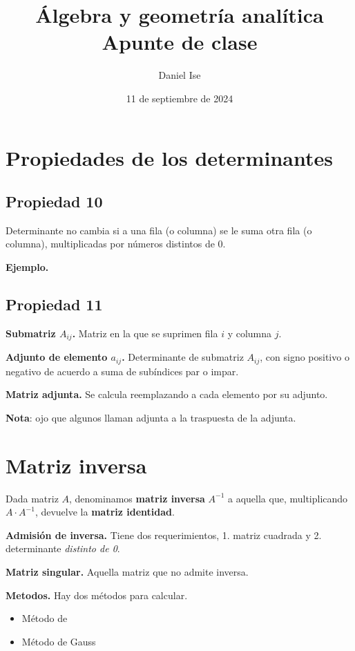\documentclass[12pt]{article}
\title{Álgebra y geometría analítica\\Apunte de clase}
\author{Daniel Ise}
\date{11 de septiembre de 2024}
\begin{document}
\maketitle

\tableofcontents

\section{Propiedades de los determinantes}

\subsection{Propiedad 10}
Determinante no cambia si a una fila (o columna)
se le suma otra fila (o columna),
multiplicadas por números distintos de 0.

\textbf{Ejemplo.}

\subsection{Propiedad 11}

\textbf{Submatriz \(A_{ij}\).}
Matriz en la que se suprimen fila \(i\) y columna \(j\).

\textbf{Adjunto de elemento \(a_{ij}\).}
Determinante de submatriz \(A_{ij}\),
con signo positivo o negativo de acuerdo a suma de subíndices par o impar.

\textbf{Matriz adjunta.}
Se calcula reemplazando a cada elemento por su adjunto.

\textbf{Nota}: ojo que algunos llaman adjunta a la traspuesta de la adjunta.

\section{Matriz inversa}

Dada matriz \(A\),
denominamos \textbf{matriz inversa} \(A^{-1}\) a aquella que,
multiplicando \(A \cdot A^{-1}\),
devuelve la \textbf{matriz identidad}.

\textbf{Admisión de inversa.}
Tiene dos requerimientos,
1. matriz cuadrada y
2. determinante \textit{distinto de 0}.

\textbf{Matriz singular.} 
Aquella matriz que no admite inversa.

\textbf{Metodos.}
Hay dos métodos para calcular.
\begin{itemize}
    \item Método de 
    \item Método de Gauss
\end{itemize}
\end{document}
